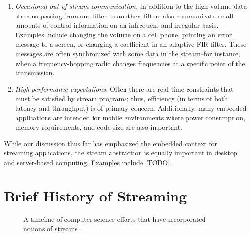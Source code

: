 \begin{enumerate}

\item {\it Occasional out-of-stream communication.}  In addition to
  the high-volume data streams passing from one filter to another,
  filters also communicate small amounts of control information on an
  infrequent and irregular basis.  Examples include changing the
  volume on a cell phone, printing an error message to a screen, or
  changing a coefficient in an adaptive FIR filter.  These messages
  are often synchronized with some data in the stream--for instance,
  when a frequency-hopping radio changes frequencies at a specific
  point of the transmission.

\item {\it High performance expectations.}  Often there are real-time
  constraints that must be satisfied by stream programs; thus,
  efficiency (in terms of both latency and throughput) is of primary
  concern.  Additionally, many embedded applications are intended for
  mobile environments where power consumption, memory requirements,
  and code size are also important.

\end{enumerate}

While our discussion thus far has emphasized the embedded context for
streaming applications, the stream abstraction is equally important in
desktop and server-based computing.  Examples include [TODO].


\section{Brief History of Streaming}

\begin{figure}[t]
\caption{A timeline of computer science efforts that have incorporated
  notions of streams.\protect\label{fig:history-of-streaming}}
\end{figure}

